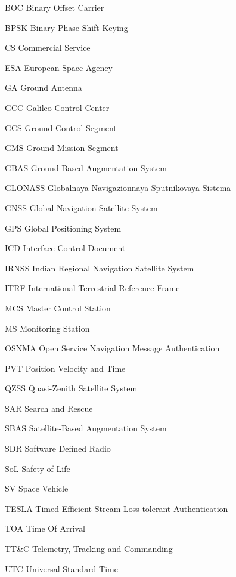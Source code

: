 \begin{abbreviations}

\item[BOC] Binary Offset Carrier
\item[BPSK] Binary Phase Shift Keying
\item[CS] Commercial Service
\item[ESA] European Space Agency
\item[GA] Ground Antenna
\item[GCC] Galileo Control Center
\item[GCS] Ground Control Segment
\item[GMS] Ground Mission Segment 
\item[GBAS] Ground-Based Augmentation System
\item[GLONASS] Globalnaya Navigazionnaya Sputnikovaya Sistema
\item[GNSS] Global Navigation Satellite System
\item[GPS] Global Positioning System
\item[ICD] Interface Control Document
\item[IRNSS] Indian Regional Navigation Satellite System
\item[ITRF] International Terrestrial Reference Frame
\item[MCS] Master Control Station
\item[MS] Monitoring Station
\item[OSNMA] Open Service Navigation Message Authentication
\item[PVT] Position Velocity and Time
\item[QZSS] Quasi-Zenith Satellite System
\item[SAR] Search and Rescue
\item[SBAS] Satellite-Based Augmentation System
\item[SDR] Software Defined Radio
\item[SoL] Safety of Life
\item[SV] Space Vehicle
\item[TESLA] Timed Efficient Stream Loss-tolerant Authentication
\item[TOA] Time Of Arrival
\item[TT&C] Telemetry, Tracking and Commanding
\item[UTC] Universal Standard Time

\end{abbreviations}
